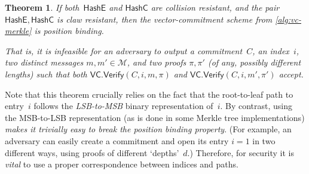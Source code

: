 \documentclass[11pt,hidelinks]{article}
\newtheorem{theorem}{Theorem}[section]
\newcommand{\algo}[1]{\ensuremath{\mathsf{#1}}}
\newcommand{\msgspace}{\ensuremath{\mathcal{M}}}
\newcommand{\VC}{\algo{VC}}
\newcommand{\Verify}{\algo{Verify}}
\newcommand{\HashEntry}{\algo{HashE}}
\newcommand{\HashChildren}{\algo{HashC}}
\begin{document}
\begin{theorem}
  \label{thm:tree-vc}
  If both~$\HashEntry$ and $\HashChildren$ are collision resistant,
  and the pair $\HashEntry,\HashChildren$ is claw resistant, then the
  vector-commitment scheme from \cref{alg:vc-merkle} is position
  binding.

  That is, it is infeasible for an adversary to output a
  commitment~$C$, an index~$i$, two \emph{distinct} messages
  $m,m' \in \msgspace$, and two proofs $\pi, \pi'$ (of any, possibly
  different lengths) such that both $\VC.\Verify(C,i,m,\pi)$ and
  $\VC.\Verify(C,i,m',\pi')$ accept.
\end{theorem}

Note that this theorem crucially relies on the fact that the
root-to-leaf path to entry~$i$ follows the \emph{LSB-to-MSB} binary
representation of~$i$. By contrast, using the MSB-to-LSB
representation (as is done in some Merkle tree implementations)
\emph{makes it trivially easy to break the position binding
  property}. (For example, an adversary can easily create a commitment
and open its entry $i=1$ in two different ways, using proofs of
different `depths'~$d$.) Therefore, for security it is \emph{vital} to
use a proper correspondence between indices and paths.
\end{document}

